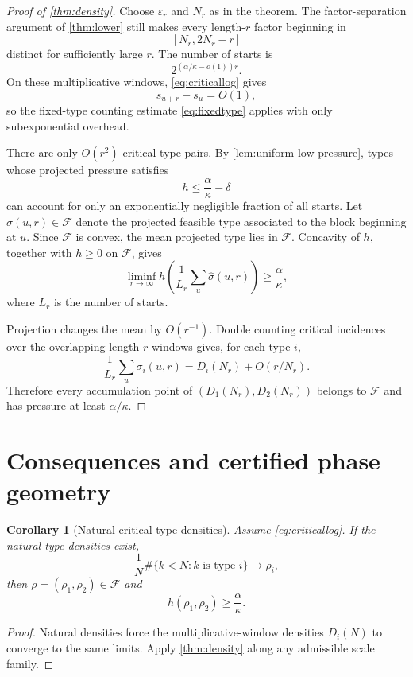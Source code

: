 \documentclass[11pt]{amsart}
\newtheorem{corollary}[theorem]{Corollary}
\newcommand{\Fcal}{\mathcal F}
\begin{document}
\begin{proof}[Proof of \cref{thm:density}]
Choose \(\varepsilon_r\) and \(N_r\) as in the theorem.  The factor-separation argument of \cref{thm:lower} still makes every length-\(r\) factor beginning in
\[
 [N_r,2N_r-r]
\]
distinct for sufficiently large \(r\).  The number of starts is
\[
 2^{(\alpha/\kappa-o(1))r}.
\]
On these multiplicative windows, \eqref{eq:criticallog} gives
\[
 s_{u+r}-s_u=O(1),
\]
so the fixed-type counting estimate \eqref{eq:fixedtype} applies with only subexponential overhead.

There are only \(O(r^2)\) critical type pairs.  By \cref{lem:uniform-low-pressure}, types whose projected pressure satisfies
\[
 h\le\frac{\alpha}{\kappa}-\delta
\]
can account for only an exponentially negligible fraction of all starts.  Let \(\widehat\sigma(u,r)\in\Fcal\) denote the projected feasible type associated to the block beginning at \(u\).  Since \(\Fcal\) is convex, the mean projected type lies in \(\Fcal\).  Concavity of \(h\), together with \(h\ge0\) on \(\Fcal\), gives
\[
 \liminf_{r\to\infty}
 h\left(
 \frac1{L_r}\sum_u\widehat\sigma(u,r)
 \right)
 \ge\frac{\alpha}{\kappa},
\]
where \(L_r\) is the number of starts.

Projection changes the mean by \(O(r^{-1})\).  Double counting critical incidences over the overlapping length-\(r\) windows gives, for each type \(i\),
\[
 \frac1{L_r}\sum_u\sigma_i(u,r)
 =D_i(N_r)+O(r/N_r).
\]
Therefore every accumulation point of \((D_1(N_r),D_2(N_r))\) belongs to \(\Fcal\) and has pressure at least \(\alpha/\kappa\).
\end{proof}

\section{Consequences and certified phase geometry}

\begin{corollary}[Natural critical-type densities]\label{cor:naturaldensity}
Assume \eqref{eq:criticallog}.  If the natural type densities exist,
\[
 \frac1N\#\{k<N:k\text{ is type }i\}\longrightarrow\rho_i,
\]
then \(\rho=(\rho_1,\rho_2)\in\Fcal\) and
\[
 h(\rho_1,\rho_2)\ge\frac{\alpha}{\kappa}.
\]
\end{corollary}

\begin{proof}
Natural densities force the multiplicative-window densities \(D_i(N)\) to converge to the same limits.  Apply \cref{thm:density} along any admissible scale family.
\end{proof}
\end{document}
